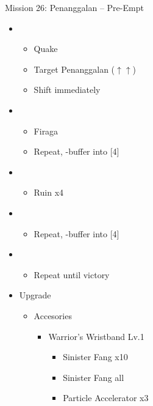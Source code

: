 \begin{battle}{Mission 26: Penanggalan -- Pre-Empt}
	\begin{itemize}
		\item \second
			\begin{itemize}
				\item Quake
				\item Target Penanggalan ($\uparrow\uparrow$)
				\item Shift immediately
			\end{itemize}
		\item \third
			\begin{itemize}
				\item Firaga
				\item Repeat, \com-buffer into [4]
			\end{itemize}
		\item \fourth
			\begin{itemize}
				\item Ruin x4
			\end{itemize}
		\item \third
			\begin{itemize}
				\item Repeat, \com-buffer into [4]
			\end{itemize}
		\item \fourth
			\begin{itemize}
				\item Repeat until victory
			\end{itemize}
	\end{itemize}
\end{battle}

\begin{upgrade}
	\begin{itemize}
		\item Upgrade
			\begin{itemize}
				\item Accesories
					\begin{itemize}
						\item Warrior's Wristband Lv.1
							\begin{itemize}
								\item Sinister Fang x10
								\item Sinister Fang all
								\item Particle Accelerator x3
							\end{itemize}
					\end{itemize}
			\end{itemize}
	\end{itemize}
\end{upgrade}

